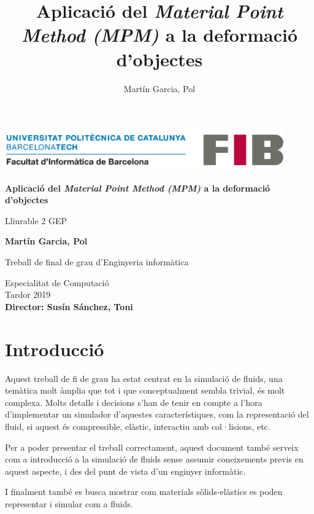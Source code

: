 \documentclass[a4paper]{report}
\title{Aplicació del \textit{Material Point Method (MPM)} a la deformació d'objectes}
\author{Martín Garcia, Pol}
\date{\parbox{\linewidth}{\centering%
		2019, Quadrimestre de tardor\endgraf\bigskip
		Director: Susín Sánchez, Toni\endgraf \medskip
		Especialitat Computació \endgraf
}}
\begin{document}

\begin{titlepage}
	
	\begin{center}


	
		\includegraphics[width=12cm]{images/logo-fib.png} %
	\vfill
	
	\Huge
	\textbf{Aplicació del \textit{Material Point Method (MPM)} a la deformació d'objectes}  
	
	\vspace{0.5cm}
	\LARGE
	Lliurable 2 GEP

	\vspace{1.5cm}
	
	\textbf{Martín Garcia, Pol}

	\vfill
	
	Treball de final de grau d'Enginyeria informàtica
	
	\vspace{0.8cm}
	
	\Large
	Especialitat de Computació \\
	Tardor 2019 \\
	\vspace{0.5cm}
\textbf{Director: Susín Sánchez, Toni}
	\end{center}
\end{titlepage}


	\newpage
	

	\renewcommand{\contentsname}{Índex}
	\renewcommand{\cftsecfont}{\normalfont\bfseries}
	
	\tableofcontents
	\newpage
	
	\setcounter{page}{2}


	\chapter{Introducció}

	Aquest treball de fi de grau ha estat centrat en la simulació de fluids, una temàtica molt àmplia que tot i que conceptualment sembla trivial, és molt complexa. Molts detalls i decisions s'han de tenir en compte a l'hora d'implementar un simulador d'aquestes característiques, com la representació del fluid, si aquest és compressible, elàstic, interactiu amb col·lisions, etc. \par
	Per a poder presentar el treball correctament, aquest document també serveix com a introducció a la simulació de fluids sense assumir coneixements previs en aquest aspecte, i des del punt de vista d'un enginyer informàtic.\par
	I finalment també es busca mostrar com materials sòlids-elàstics es poden representar i simular com a fluids.
\end{document}
